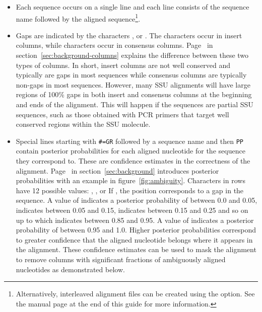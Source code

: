 \begin{itemize}


\item Each sequence occurs on a single line and each line consists of
  the sequence name followed by the aligned sequence\footnote{Alternatively,
  interleaved alignment files can be created using the 
  option. See the  manual page at the 
  end of this guide for more information.}.

\item Gaps are indicated by the characters , or
  \prog{-}.  The  characters occur in insert columns,
  while \prog{-} characters occur in consensus
  columns. Page~\pageref{sec:background-columns} in
  section~\ref{sec:background-columns} explains the difference between
  these two types of columns. In short, insert columns are not well
  conserved and typically are gaps in most sequences while consensus
  columns are typically non-gaps in most sequences.
  However, many SSU alignments will have large regions of 100\% gaps
  in both insert and consensus columns at the
  beginning and ends of the alignment.  This will happen if the
  sequences are partial SSU sequences, such as those obtained with PCR
  primers that target well conserved regions within the SSU molecule.

\item Special lines starting with {\small\verb+#=GR+} followed by a
  sequence name and then {\small\verb+PP+} contain posterior
  probabilities for each aligned nucleotide for the sequence they
  correspond to.  These are confidence estimates in the correctness of
  the alignment.  Page~\pageref{sec:background-pp} in
  section~\ref{sec:background} introduces posterior probabilities with
  an example in figure~\ref{fig:ambiguity}.
  Characters in  rows have 12 possible values: , \prog{*}, or
   If , the position corresponds to a gap in the sequence. A
  value of  indicates a posterior probability of between 0.0 and
  0.05,  indicates between 0.05 and 0.15,  indicates between
  0.15 and 0.25 and so on up to  which indicates between 0.85 and
  0.95. A value of \prog{*} indicates a posterior probability of between
  0.95 and 1.0. Higher posterior probabilities correspond to greater
  confidence that the aligned nucleotide belongs where it appears in
  the alignment.  These confidence estimates can be used to mask the
  alignment to remove columns with significant fractions of
  ambiguously aligned nucleotides as demonstrated below.


\end{itemize}

